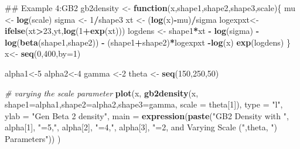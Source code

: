 \documentclass[]{book}
\newenvironment{Shaded}{\begin{snugshade}}{\end{snugshade}}
\newcommand{\KeywordTok}[1]{\textcolor[rgb]{0.13,0.29,0.53}{\textbf{#1}}}
\newcommand{\DataTypeTok}[1]{\textcolor[rgb]{0.13,0.29,0.53}{#1}}
\newcommand{\DecValTok}[1]{\textcolor[rgb]{0.00,0.00,0.81}{#1}}
\newcommand{\StringTok}[1]{\textcolor[rgb]{0.31,0.60,0.02}{#1}}
\newcommand{\CommentTok}[1]{\textcolor[rgb]{0.56,0.35,0.01}{\textit{#1}}}
\newcommand{\ControlFlowTok}[1]{\textcolor[rgb]{0.13,0.29,0.53}{\textbf{#1}}}
\newcommand{\OperatorTok}[1]{\textcolor[rgb]{0.81,0.36,0.00}{\textbf{#1}}}
\newcommand{\NormalTok}[1]{#1}
\theoremstyle{definition}
\theoremstyle{definition}
\theoremstyle{definition}
\theoremstyle{remark}
\begin{document}
\begin{Shaded}
\begin{Highlighting}[]
\NormalTok{## Example 4:GB2}
\NormalTok{gb2density <-}\StringTok{ }\ControlFlowTok{function}\NormalTok{(x,shape1,shape2,shape3,scale)\{}
\NormalTok{  mu <-}\StringTok{ }\KeywordTok{log}\NormalTok{(scale)}
\NormalTok{  sigma <-}\StringTok{ }\DecValTok{1}\OperatorTok{/}\NormalTok{shape3}
\NormalTok{  xt <-}\StringTok{ }\NormalTok{(}\KeywordTok{log}\NormalTok{(x)}\OperatorTok{-}\NormalTok{mu)}\OperatorTok{/}\NormalTok{sigma}
\NormalTok{  logexpxt<-}\KeywordTok{ifelse}\NormalTok{(xt}\OperatorTok{>}\DecValTok{23}\NormalTok{,yt,}\KeywordTok{log}\NormalTok{(}\DecValTok{1}\OperatorTok{+}\KeywordTok{exp}\NormalTok{(xt)))}
\NormalTok{  logdens <-}\StringTok{ }\NormalTok{shape1}\OperatorTok{*}\NormalTok{xt }\OperatorTok{-}\StringTok{ }\KeywordTok{log}\NormalTok{(sigma) }\OperatorTok{-}\StringTok{ }\KeywordTok{log}\NormalTok{(}\KeywordTok{beta}\NormalTok{(shape1,shape2)) }\OperatorTok{-}\StringTok{ }\NormalTok{(shape1}\OperatorTok{+}\NormalTok{shape2)}\OperatorTok{*}\NormalTok{logexpxt }\OperatorTok{-}\KeywordTok{log}\NormalTok{(x) }
  \KeywordTok{exp}\NormalTok{(logdens)}
\NormalTok{\}}
\NormalTok{x<-}\StringTok{ }\KeywordTok{seq}\NormalTok{(}\DecValTok{0}\NormalTok{,}\DecValTok{400}\NormalTok{,}\DataTypeTok{by=}\DecValTok{1}\NormalTok{)}

\NormalTok{alpha1<-}\DecValTok{5}
\NormalTok{alpha2<-}\DecValTok{4} 
\NormalTok{gamma <-}\DecValTok{2}
\NormalTok{theta <-}\StringTok{ }\KeywordTok{seq}\NormalTok{(}\DecValTok{150}\NormalTok{,}\DecValTok{250}\NormalTok{,}\DecValTok{50}\NormalTok{)}

\CommentTok{# varying the scale parameter}
\KeywordTok{plot}\NormalTok{(x, }\KeywordTok{gb2density}\NormalTok{(x, }\DataTypeTok{shape1=}\NormalTok{alpha1,}\DataTypeTok{shape2=}\NormalTok{alpha2,}\DataTypeTok{shape3=}\NormalTok{gamma, }\DataTypeTok{scale =}\NormalTok{ theta[}\DecValTok{1}\NormalTok{]), }
     \DataTypeTok{type =} \StringTok{"l"}\NormalTok{, }\DataTypeTok{ylab =} \StringTok{"Gen Beta 2 density"}\NormalTok{,}
     \DataTypeTok{main =} 
     \KeywordTok{expression}\NormalTok{(}\KeywordTok{paste}\NormalTok{(}\StringTok{"GB2 Density with "}\NormalTok{, alpha[}\DecValTok{1}\NormalTok{], }\StringTok{"=5,"}\NormalTok{, alpha[}\DecValTok{2}\NormalTok{], }\StringTok{"=4,"}\NormalTok{, alpha[}\DecValTok{3}\NormalTok{], }
                      \StringTok{"=2, and Varying Scale ("}\NormalTok{,theta, }\StringTok{") Parameters"}\NormalTok{)) )}


\end{Highlighting}
\end{Shaded}
\end{document}
